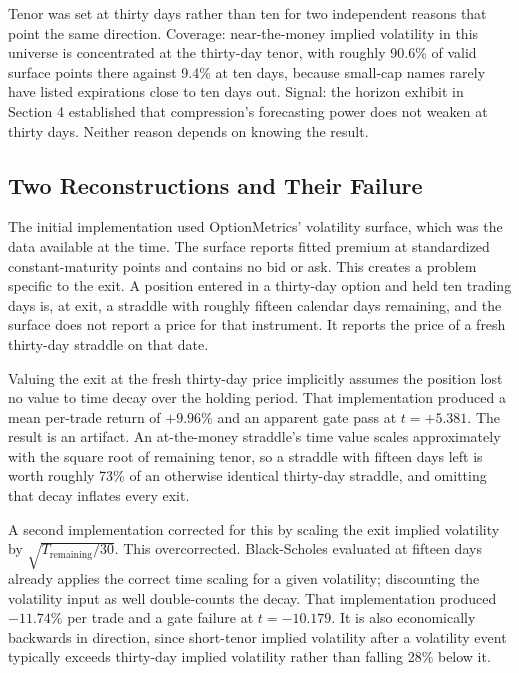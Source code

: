 \documentclass[11pt]{article}
\begin{document}
Tenor was set at thirty days rather than ten for two independent reasons that point the same direction. Coverage: near-the-money implied volatility in this universe is concentrated at the thirty-day tenor, with roughly 90.6\% of valid surface points there against 9.4\% at ten days, because small-cap names rarely have listed expirations close to ten days out. Signal: the horizon exhibit in Section 4 established that compression's forecasting power does not weaken at thirty days. Neither reason depends on knowing the result.

\subsection{Two Reconstructions and Their Failure}

The initial implementation used OptionMetrics' volatility surface, which was the data available at the time. The surface reports fitted premium at standardized constant-maturity points and contains no bid or ask. This creates a problem specific to the exit. A position entered in a thirty-day option and held ten trading days is, at exit, a straddle with roughly fifteen calendar days remaining, and the surface does not report a price for that instrument. It reports the price of a fresh thirty-day straddle on that date.

Valuing the exit at the fresh thirty-day price implicitly assumes the position lost no value to time decay over the holding period. That implementation produced a mean per-trade return of $+9.96\%$ and an apparent gate pass at $t = +5.381$. The result is an artifact. An at-the-money straddle's time value scales approximately with the square root of remaining tenor, so a straddle with fifteen days left is worth roughly 73\% of an otherwise identical thirty-day straddle, and omitting that decay inflates every exit.

A second implementation corrected for this by scaling the exit implied volatility by $\sqrt{T_{\text{remaining}}/30}$. This overcorrected. Black-Scholes evaluated at fifteen days already applies the correct time scaling for a given volatility; discounting the volatility input as well double-counts the decay. That implementation produced $-11.74\%$ per trade and a gate failure at $t = -10.179$. It is also economically backwards in direction, since short-tenor implied volatility after a volatility event typically exceeds thirty-day implied volatility rather than falling 28\% below it.
\end{document}
